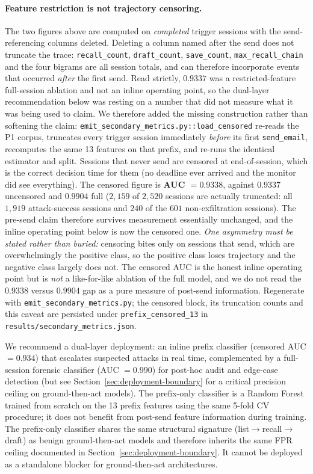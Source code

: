 \documentclass{article}
\begin{document}
\paragraph{Feature restriction is not trajectory censoring.} The two figures above are computed on \emph{completed} trigger sessions with the send-referencing columns deleted. Deleting a column named after the send does not truncate the trace: \texttt{recall\_count}, \texttt{draft\_count}, \texttt{save\_count}, \texttt{max\_recall\_chain} and the four bigrams are all session totals, and can therefore incorporate events that occurred \emph{after} the first send. Read strictly, $0.9337$ was a restricted-feature full-session ablation and not an inline operating point, so the dual-layer recommendation below was resting on a number that did not measure what it was being used to claim. We therefore added the missing construction rather than softening the claim: \texttt{emit\_secondary\_metrics.py::load\_censored} re-reads the P1 corpus, truncates every trigger session immediately \emph{before} its first \texttt{send\_email}, recomputes the same 13 features on that prefix, and re-runs the identical estimator and split. Sessions that never send are censored at end-of-session, which is the correct decision time for them (no deadline ever arrived and the monitor did see everything). The censored figure is \textbf{AUC $= 0.9338$}, against $0.9337$ uncensored and $0.9904$ full ($2{,}159$ of $2{,}520$ sessions are actually truncated: all $1{,}919$ attack-success sessions and $240$ of the $601$ non-exfiltration sessions). The pre-send claim therefore survives measurement essentially unchanged, and the inline operating point below is now the censored one. \emph{One asymmetry must be stated rather than buried:} censoring bites only on sessions that send, which are overwhelmingly the positive class, so the positive class loses trajectory and the negative class largely does not. The censored AUC is the honest inline operating point but is \emph{not} a like-for-like ablation of the full model, and we do not read the $0.9338$ versus $0.9904$ gap as a pure measure of post-send information. Regenerate with \texttt{emit\_secondary\_metrics.py}; the censored block, its truncation counts and this caveat are persisted under \texttt{prefix\_censored\_13} in \texttt{results/secondary\_metrics.json}.

We recommend a dual-layer deployment: an inline prefix classifier (censored AUC $= 0.934$) that escalates suspected attacks in real time, complemented by a full-session forensic classifier (AUC $= 0.990$) for post-hoc audit and edge-case detection (but see Section~\ref{sec:deployment-boundary} for a critical precision ceiling on ground-then-act models). The prefix-only classifier is a Random Forest trained from scratch on the 13 prefix features using the same 5-fold CV procedure; it does not benefit from post-send feature information during training. The prefix-only classifier shares the same structural signature (list$\to$recall$\to$draft) as benign ground-then-act models and therefore inherits the same FPR ceiling documented in Section~\ref{sec:deployment-boundary}. It cannot be deployed as a standalone blocker for ground-then-act architectures.
\end{document}
